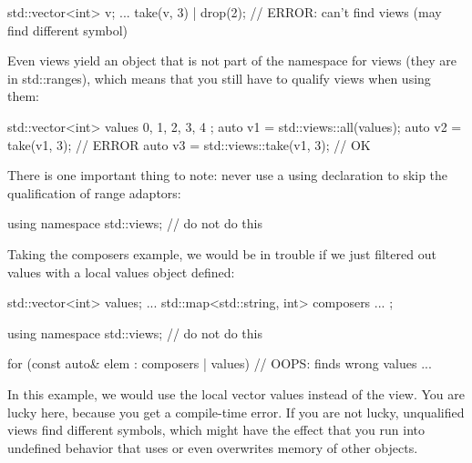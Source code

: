 \begin{cpp}
std::vector<int> v;
...
take(v, 3) | drop(2); // ERROR: can’t find views (may find different symbol)
\end{cpp}

Even views yield an object that is not part of the namespace for views (they are in std::ranges), which means that you still have to qualify views when using them:

\begin{cpp}
std::vector<int> values{ 0, 1, 2, 3, 4 };
auto v1 = std::views::all(values);
auto v2 = take(v1, 3); // ERROR
auto v3 = std::views::take(v1, 3); // OK
\end{cpp}

There is one important thing to note: never use a using declaration to skip the qualification of range adaptors:

\begin{cpp}
using namespace std::views; // do not do this
\end{cpp}

Taking the composers example, we would be in trouble if we just filtered out values with a local values object defined:

\begin{cpp}
std::vector<int> values;
...
std::map<std::string, int> composers{ ... };

using namespace std::views; // do not do this

for (const auto& elem : composers | values) { // OOPS: finds wrong values
	...
}
\end{cpp}

In this example, we would use the local vector values instead of the view. You are lucky here, because you get a compile-time error. If you are not lucky, unqualified views find different symbols, which might have the effect that you run into undefined behavior that uses or even overwrites memory of other objects.
